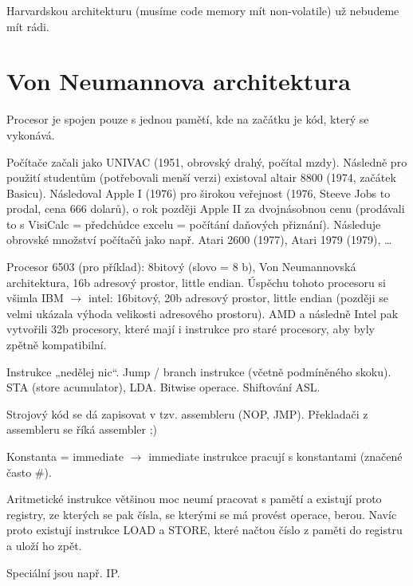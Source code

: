 \documentclass[12pt]{article}					%
\begin{document}
        \begin{poznamka}
                Harvardskou architekturu (musíme code memory mít non-volatile) už nebudeme mít rádi. 
        \end{poznamka}

    \section{Von Neumannova architektura}
        \begin{definice}
            Procesor je spojen pouze s jednou pamětí, kde na začátku je kód, který se vykonává.
        \end{definice}
        
        \begin{poznamka}[Historie]
            Počítače začali jako UNIVAC (1951, obrovský drahý, počítal mzdy). Následně pro použití studentům (potřebovali menší verzi) existoval altair 8800 (1974, začátek Basicu). Následoval Apple I (1976) pro širokou veřejnost (1976, Steeve Jobs to prodal, cena 666 dolarů), o rok později Apple II za dvojnásobnou cenu (prodávali to s VisiCalc = předchůdce excelu = počítání daňových přiznání). Následuje obrovské množství počítačů jako např. Atari 2600 (1977), Atari 1979 (1979), …

            Procesor 6503 (pro příklad): 8bitový (slovo = 8 b), Von Neumannovská architektura, 16b adresový prostor, little endian. Úspěchu tohoto procesoru si všimla IBM $\rightarrow$ intel: 16bitový, 20b adresový prostor, little endian (později se velmi ukázala výhoda velikosti adresového prostoru). AMD a následně Intel pak vytvořili 32b procesory, které mají i instrukce pro staré procesory, aby byly zpětně kompatibilní.
        \end{poznamka}

        \begin{definice}
            Instrukce „nedělej nic“. Jump / branch instrukce (včetně podmíněného skoku). STA (store acumulator), LDA. Bitwise operace. Shiftování ASL.

            Strojový kód se dá zapisovat v tzv. assembleru (NOP, JMP). Překladači z assembleru se říká assembler ;)

            Konstanta = immediate $\rightarrow$ immediate instrukce pracují s konstantami (značené často \#).
        \end{definice}

        \begin{definice}
            Aritmetické instrukce většinou moc neumí pracovat s pamětí a existují proto registry, ze kterých se pak čísla, se kterými se má provést operace, berou. Navíc proto existují instrukce LOAD a STORE, které načtou číslo z paměti do registru a uloží ho zpět.

            Speciální jsou např. IP.
        \end{definice}
\end{document}
